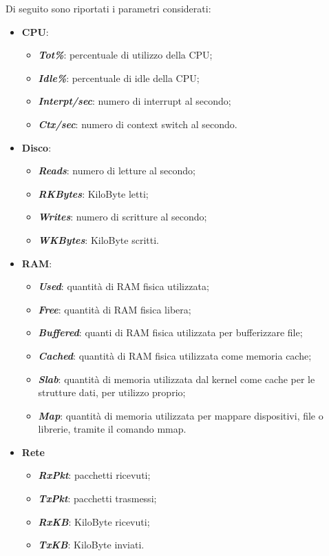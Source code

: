 Di seguito sono riportati i parametri considerati:
\begin{itemize}
  \item \textbf{CPU}:
  \begin{itemize}
    \item \textbf{\textit{Tot\%}}: percentuale di utilizzo della CPU;
    \item \textbf{\textit{Idle\%}}: percentuale di idle della CPU;
    \item \textbf{\textit{Interpt/sec}}: numero di interrupt al secondo;
    \item \textbf{\textit{Ctx/sec}}: numero di context switch al secondo.
  \end{itemize}
  \item \textbf{Disco}:
  \begin{itemize}
    \item \textbf{\textit{Reads}}: numero di letture al secondo;
    \item \textbf{\textit{RKBytes}}: KiloByte letti;
    \item \textbf{\textit{Writes}}: numero di scritture al secondo;
    \item \textbf{\textit{WKBytes}}: KiloByte scritti.
  \end{itemize}
  \item \textbf{RAM}:
  \begin{itemize}
    \item \textbf{\textit{Used}}: quantità di RAM fisica utilizzata;
    \item \textbf{\textit{Free}}: quantità di RAM fisica libera;
    \item \textbf{\textit{Buffered}}: quanti di RAM fisica utilizzata
    per bufferizzare file;
    \item \textbf{\textit{Cached}}: quantità di RAM fisica utilizzata come memoria cache;
    \item \textbf{\textit{Slab}}: quantità di memoria utilizzata dal kernel come cache per
    le strutture dati, per utilizzo proprio;
    \item \textbf{\textit{Map}}: quantità di memoria utilizzata
    per mappare dispositivi, file o librerie, tramite il comando mmap.
  \end{itemize}
  \item \textbf{Rete}
  \begin{itemize}
    \item \textbf{\textit{RxPkt}}: pacchetti ricevuti;
    \item \textbf{\textit{TxPkt}}: pacchetti trasmessi;
    \item \textbf{\textit{RxKB}}: KiloByte ricevuti;
    \item \textbf{\textit{TxKB}}: KiloByte inviati.
  \end{itemize}
\end{itemize}

